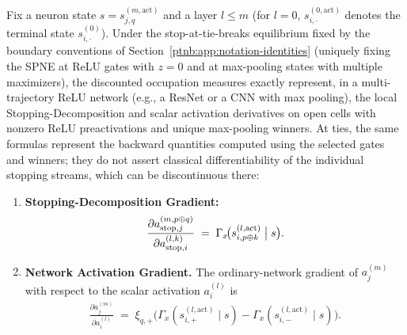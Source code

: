 \begin{theoremenv}\label{ptnb:thm:deriv-occ}\label{thm:gradient_occupation}
Fix a neuron state $s = s_{j,q}^{(m, \mathrm{act})}$ and a layer $l \le m$ (for $l = 0$,
$s_{i,\cdot}^{(0,\mathrm{act})}$ denotes the terminal state $s_{i,\cdot}^{(0)}$). Under the
stop-at-tie-breaks equilibrium fixed by the boundary conventions of
Section~\ref{ptnb:app:notation-identities} (uniquely fixing the SPNE at ReLU gates with $z = 0$ and at
max-pooling states with multiple maximizers), the discounted occupation measures exactly represent,
in a multi-trajectory ReLU network (e.g., a ResNet or a CNN with max pooling), the local
Stopping-Decomposition and scalar activation derivatives on open cells with nonzero ReLU preactivations and unique max-pooling winners. At ties, the same formulas represent the backward quantities computed using the selected gates and winners; they do not assert classical differentiability of the individual stopping streams, which can be discontinuous there:
\begin{enumerate}
    \item \textbf{Stopping-Decomposition Gradient:}
        \begin{align}
            \frac{\partial a_{\mathrm{stop},j}^{(m, p \oplus q)}}{\partial a_{\mathrm{stop},i}^{(l, k)}}
            \;=\;
            \Gamma_x\!\bigl(s_{i, p \oplus k}^{(l, \mathrm{act})} \bigm| s\bigr).
        \end{align}
    \item \textbf{Network Activation Gradient.} The ordinary-network gradient of $a_j^{(m)}$ with respect to
        the scalar activation $a_i^{(l)}$ is
        \begin{align}
            \frac{\partial a_j^{(m)}}{\partial a_i^{(l)}}
            \;=\;
            \xi_{q, +}\bigl(\Gamma_x(s_{i, +}^{(l, \mathrm{act})} \mid s) - \Gamma_x(s_{i, -}^{(l,
            \mathrm{act})} \mid s)\bigr).
        \end{align}
\end{enumerate}
\hfill{}
\end{theoremenv}

